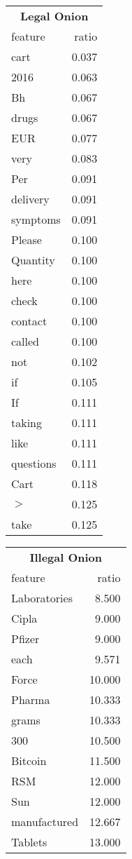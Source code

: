\documentclass[11pt,a4paper,table]{article}
\begin{document}
\begin{table}[t]
\small
\centering
\begin{tabular}{p{21mm}r|}
\multicolumn{2}{c}{\textbf{Legal Onion}}\\
feature & ratio\\
\hline
cart & 0.037\\
2016 & 0.063\\
Bh & 0.067\\
drugs & 0.067\\
EUR & 0.077\\
very & 0.083\\
Per & 0.091\\
delivery & 0.091\\
symptoms & 0.091\\
Please & 0.100\\
Quantity & 0.100\\
here & 0.100\\
check & 0.100\\
contact & 0.100\\
called & 0.100\\
not & 0.102\\
if & 0.105\\
If & 0.111\\
taking & 0.111\\
like & 0.111\\
questions & 0.111\\
Cart & 0.118\\
$>$ & 0.125\\
take & 0.125\\
\end{tabular}
\begin{tabular}{p{21mm}r}
\multicolumn{2}{c}{\textbf{Illegal Onion}}\\
feature & ratio\\
\hline
Laboratories & 8.500\\
Cipla & 9.000\\
Pfizer & 9.000\\
each & 9.571\\
Force & 10.000\\
Pharma & 10.333\\
grams & 10.333\\
300 & 10.500\\
Bitcoin & 11.500\\
RSM & 12.000\\
Sun & 12.000\\
manufactured & 12.667\\
Tablets & 13.000\\

\end{tabular}
\end{table}
\end{document}
